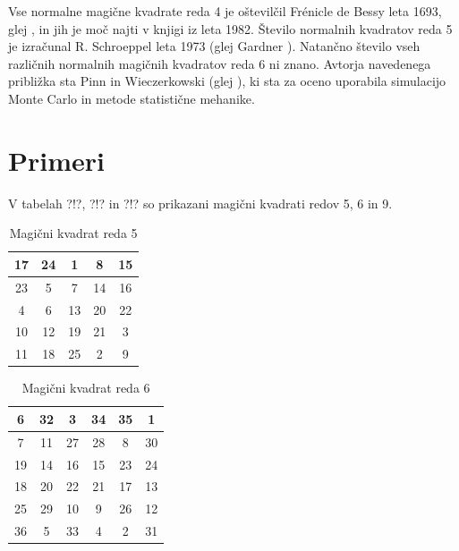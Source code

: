 \documentclass[a4paper,12pt]{article}
\newenvironment{magic}[3]
{
    \begin{table}[!ht]
    \centering
    \caption{#2}
    \label{#3}
    \large
    \begin{tabular}{|*{#1}{c|}}
    \hline
}
{
    \end{tabular}
    \normalsize
    \end{table}
}
\theoremstyle{definition}
\theoremstyle{plain}
\begin{document}
Vse normalne magične kvadrate reda 4 je oštevilčil Frénicle de Bessy
leta 1693, glej \cite{bessy}, in jih je moč najti v knjigi \cite{berlekamp}
iz leta 1982. Število normalnih kvadratov reda 5 je izračunal
R. Schroeppel leta 1973 (glej Gardner \cite{gardner}).
Natančno število vseh različnih normalnih magičnih kvadratov reda 6 ni znano.
Avtorja navedenega približka sta Pinn in Wieczerkowski (glej \cite{pinn}), ki
sta za oceno uporabila simulacijo Monte Carlo in metode statistične mehanike.


\section{Primeri}

V tabelah ?!?, ?!? in ?!? so prikazani
magični kvadrati redov 5, 6 in 9. %

\begin{magic}{5}{Magični kvadrat reda 5}{table:mag5}
    17 & 24 & 1 & 8 & 15 \\ \hline
    23 & 5 & 7 & 14 & 16 \\ \hline
    4 & 6 & 13 & 20 & 22 \\ \hline
    10 & 12 & 19 & 21 & 3 \\ \hline
    11 & 18 & 25 & 2 & 9 \\ \hline
\end{magic}

\begin{magic}{6}{Magični kvadrat reda 6}{table:mag6}
    6 & 32 & 3 & 34 & 35 & 1 \\ \hline
    7 & 11 & 27 & 28 & 8 & 30 \\ \hline
    19 & 14 & 16 & 15 & 23 & 24 \\ \hline
    18 & 20 & 22 & 21 & 17 & 13 \\ \hline
    25 & 29 & 10 & 9 & 26 & 12 \\ \hline
    36 & 5 & 33 & 4 & 2 & 31 \\ \hline
\end{magic}
\end{document}
